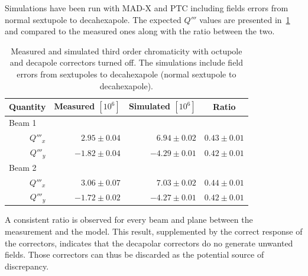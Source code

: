 Simulations have been run with MAD-X and PTC including fields errors from normal sextupole to 
decahexapole. The expected $Q'''$ values are presented
in~\cref{table:decapoles:bare_chromaticity:virgin_dq3} and compared to the measured ones along with
the ratio between the two.

\begin{table}[tbh]
    \centering
    \begin{tabular}{rrrc}
    \hline
        \toprule
        Quantity  &  Measured $[10^6]$        &  Simulated $[10^{6}]$          &   Ratio       \\
        \midrule
        \multicolumn{1}{l}{Beam 1}    &                           &                                &               \\
         $Q'''_x$ &     $ 2.95 \pm 0.04$      &       $ 6.94 \pm 0.02$         &  $0.43 \pm 0.01$\\
         $Q'''_y$ &     $-1.82 \pm 0.04$      &       $-4.29 \pm 0.01$         &  $0.42 \pm 0.01$\\
        \multicolumn{1}{l}{Beam 2}    &                           &                                &               \\
         $Q'''_x$ &     $ 3.06 \pm 0.07$      &       $ 7.03 \pm 0.02$         &  $0.44 \pm 0.01$\\
         $Q'''_y$ &     $-1.72 \pm 0.02$      &       $-4.27 \pm 0.01$         &  $0.42 \pm 0.01$\\
         \bottomrule
    \end{tabular}
    \caption{Measured and simulated third order chromaticity with octupole and decapole correctors
    turned off. The simulations include field errors from sextupoles to decahexapole (normal
    sextupole to decahexapole).}
    \label{table:decapoles:bare_chromaticity:virgin_dq3}
\end{table}

A consistent ratio is observed for every beam and plane between the measurement and the model. This
result, supplemented by the correct response of the correctors, indicates that the decapolar
correctors do no generate unwanted fields. Those correctors can thus be discarded as the potential
source of discrepancy.
\FloatBarrier